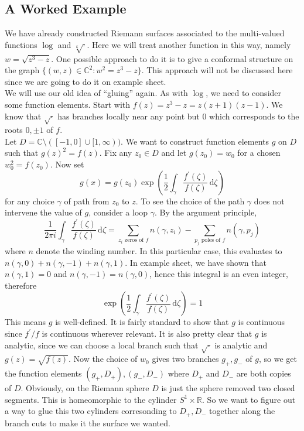 \subsection{A Worked Example}
We have already constructed Riemann surfaces associated to the multi-valued functions $\log$ and $\sqrt[k]{\cdot}$.
Here we will treat another function in this way, namely $w=\sqrt{z^3-z}$.
One possible approach to do it is to give a conformal structure on the graph $\{(w,z)\in\mathbb C^2:w^2=z^3-z\}$.
This approach will not be discussed here since we are going to do it on example sheet.\\
We will use our old idea of ``gluing'' again.
As with $\log$, we need to consider some function elements.
Start with $f(z)=z^3-z=z(z+1)(z-1)$.
We know that $\sqrt{\cdot}$ has branches locally near any point but $0$ which corresponds to the roots $0,\pm 1$ of $f$.\\
Let $D=\mathbb C\setminus([-1,0]\cup[1,\infty))$.
We want to construct function elements $g$ on $D$ such that $g(z)^2=f(z)$.
Fix any $z_0\in D$ and let $g(z_0)=w_0$ for a chosen $w_0^2=f(z_0)$.
Now set
$$g(x)=g(z_0)\exp\left( \frac{1}{2}\int_\gamma\frac{f^\prime(\zeta)}{f(\zeta)}\,\mathrm d\zeta \right)$$
for any choice $\gamma$ of path from $z_0$ to $z$.
To see the choice of the path $\gamma$ does not intervene the value of $g$, consider a loop $\gamma$.
By the argument principle,
$$\frac{1}{2\pi i}\int_\gamma\frac{f^\prime(\zeta)}{f(\zeta)}\,\mathrm d\zeta=\sum_{z_i\text{ zeros of }f}n(\gamma,z_i)-\sum_{p_j\text{ poles of }f}n(\gamma,p_j)$$
where $n$ denote the winding number.
In this particular case, this evaluates to $n(\gamma,0)+n(\gamma,-1)+n(\gamma,1)$.
In example sheet, we have shown that $n(\gamma,1)=0$ and $n(\gamma,-1)=n(\gamma,0)$, hence this integral is an even integer, therefore
$$\exp\left( \frac{1}{2}\int_\gamma\frac{f^\prime(\zeta)}{f(\zeta)}\,\mathrm d\zeta \right)=1$$
This means $g$ is well-defined.
It is fairly standard to show that $g$ is continuous since $f^\prime/f$ is continuous wherever relevant.
It is also pretty clear that $g$ is analytic, since we can choose a local branch such that $\sqrt{\cdot}$ is analytic and $g(z)=\sqrt{f(z)}$.
Now the choice of $w_0$ gives two branches $g_+,g_-$ of $g$, so we get the function elements $(g_+,D_+),(g_-,D_-)$ where $D_+$ and $D_-$ are both copies of $D$.
Obviously, on the Riemann sphere $D$ is just the sphere removed two closed segments.
This is homeomorphic to the cylinder $S^1\times\mathbb R$.
So we want to figure out a way to glue this two cylinders corresonding to $D_+,D_-$ together along the branch cuts to make it the surface we wanted.
